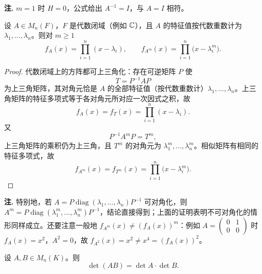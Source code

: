 \noindent\textbf{注.} \(m=1\) 时 \(H=0\)，公式给出 \(A^{-1}=I\)，与 \(A=I\) 相符。

\begin{proposition}[方幂的特征多项式]
设 \(A\in M_n(F)\)，\(F\) 是代数闭域（例如 \(\mathbb{C}\)），且 \(A\) 的特征值按代数重数计为 \(\lambda_1,\dots,\lambda_n\)。则对 \(m\ge1\)
\[
f_A(x)=\prod_{i=1}^{n}(x-\lambda_i),\qquad
f_{A^m}(x)=\prod_{i=1}^{n}\bigl(x-\lambda_i^m\bigr).
\]
\end{proposition}

\begin{proof}
代数闭域上的方阵都可上三角化：存在可逆矩阵 \(P\) 使
\[
T=P^{-1}AP
\]
为上三角矩阵，其对角元恰是 \(A\) 的全部特征值（按代数重数计）\(\lambda_1,\dots,\lambda_n\)。上三角矩阵的特征多项式等于各对角元所对应一次因式之积，故
\[
f_A(x)=f_T(x)=\prod_{i=1}^{n}(x-\lambda_i).
\]
又
\[
P^{-1}A^mP=T^m ,
\]
上三角矩阵的乘积仍为上三角，且 \(T^m\) 的对角元为 \(\lambda_1^m,\dots,\lambda_n^m\)。相似矩阵有相同的特征多项式，故
\[
f_{A^m}(x)=f_{T^m}(x)=\prod_{i=1}^{n}\bigl(x-\lambda_i^m\bigr).
\]
\end{proof}

\noindent\textbf{注.} 特别地，若 \(A=P\operatorname{diag}(\lambda_1,\dots,\lambda_n)P^{-1}\) 可对角化，则 \(A^m=P\operatorname{diag}(\lambda_1^m,\dots,\lambda_n^m)P^{-1}\)，结论直接得到；上面的证明表明不可对角化的情形同样成立。还要注意一般地 \(f_{A^m}(x)\ne(f_A(x))^m\)：例如 \(A=\begin{pmatrix}0&1\\0&0\end{pmatrix}\) 时 \(f_A(x)=x^2\)，\(A^2=0\)，故 \(f_{A^2}(x)=x^2\ne x^4=(f_A(x))^2\)。

\begin{theorem}[行列式的乘法性]
设 \(A,B\in M_n(K)\)。则
\[
\det(AB)=\det A\cdot\det B .
\]
\end{theorem}

